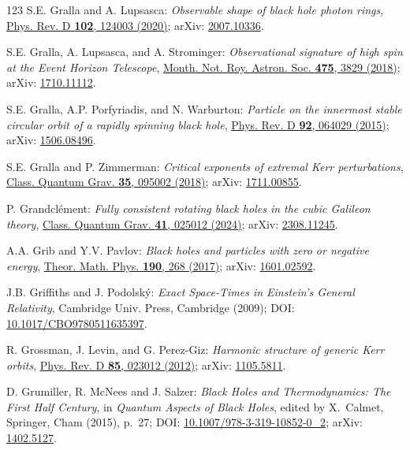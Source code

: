 \begin{thebibliography}{123}
S.E. Gralla and A. Lupsasca:
{\em Observable shape of black hole photon rings},
\href{https://doi.org/10.1103/PhysRevD.102.124003}{Phys. Rev. D {\bf 102}, 124003 (2020)};
arXiv: \href{https://arxiv.org/abs/2007.10336}{2007.10336}.

S.E. Gralla, A. Lupsasca, and A. Strominger:
{\em Observational signature of high spin at the Event Horizon Telescope},
\href{https://doi.org/10.1093/mnras/sty039}{Month. Not. Roy. Astron. Soc. {\bf 475}, 3829 (2018)};
arXiv: \href{https://arxiv.org/abs/1710.11112}{1710.11112}.

S.E. Gralla, A.P. Porfyriadis, and N. Warburton:
{\em Particle on the innermost stable circular orbit of a rapidly spinning black hole},
\href{https://doi.org/10.1103/PhysRevD.92.064029}{Phys. Rev. D {\bf 92}, 064029 (2015)};
arXiv: \href{https://arxiv.org/abs/1506.08496}{1506.08496}.

S.E. Gralla and P. Zimmerman:
{\em Critical exponents of extremal Kerr perturbations},
\href{https://doi.org/10.1088/1361-6382/aab140}{Class. Quantum Grav. {\bf 35}, 095002 (2018)};
arXiv: \href{https://arxiv.org/abs/1711.00855}{1711.00855}.

P. Grandclément:
{\em Fully consistent rotating black holes in the cubic Galileon theory},
\href{https://doi.org/10.1088/1361-6382/ad17f1}{Class. Quantum Grav. {\bf 41}, 025012 (2024)};
arXiv: \href{https://arxiv.org/abs/2308.11245}{2308.11245}.

A.A. Grib and Y.V. Pavlov:
{\em Black holes and particles with zero or negative energy},
\href{https://doi.org/10.1134/S0040577917020088}{Theor. Math. Phys. {\bf 190}, 268 (2017)};
arXiv: \href{https://arxiv.org/abs/1601.02592}{1601.02592}.

J.B. Griffiths and J. Podolský:
{\em Exact Space-Times in Einstein's General Relativity},
Cambridge Univ. Press, Cambridge (2009);
DOI: \href{https://doi.org/10.1017/CBO9780511635397}{10.1017/CBO9780511635397}.

R. Grossman, J. Levin, and G. Perez-Giz:
{\em Harmonic structure of generic Kerr orbits},
\href{https://doi.org/10.1103/PhysRevD.85.023012}{Phys. Rev. D {\bf 85}, 023012 (2012)};
arXiv: \href{https://arxiv.org/abs/1105.5811}{1105.5811}.

D. Grumiller, R. McNees and J. Salzer:
{\em Black Holes and Thermodynamics: The First Half Century},
in {\em Quantum Aspects of Black Holes}, edited by X.~Calmet,
Springer, Cham (2015), p.~27;
DOI: \href{https://doi.org/10.1007/978-3-319-10852-0_2}{10.1007/978-3-319-10852-0\_2};
arXiv: \href{https://arxiv.org/abs/1402.5127}{1402.5127}.


\end{thebibliography}
